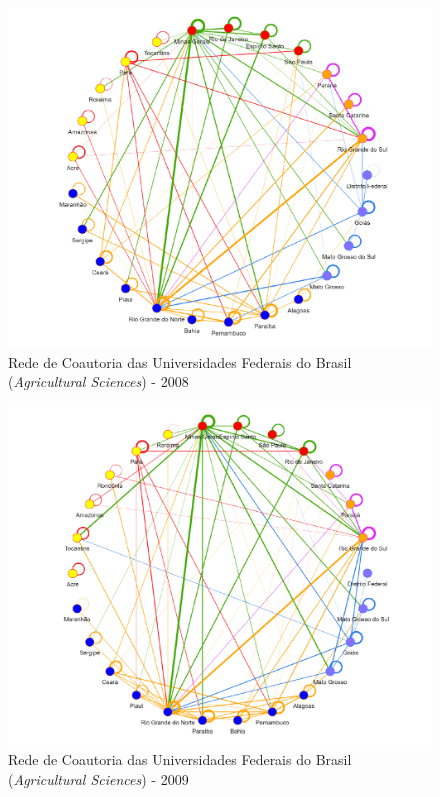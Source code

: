 \begin{figure}[H]
	\centering
	\includegraphics[scale=0.6]{Imagens/rede-agr-br-2008.pdf}
	\caption{Rede de Coautoria das Universidades Federais do Brasil (\textit{Agricultural Sciences}) - 2008}
	\label{Rede de Coautoria - UF AGRI BR 2008}
\end{figure}

\begin{figure}[H]
	\centering
	\includegraphics[scale=0.6]{Imagens/rede-agr-br-2009.pdf}
	\caption{Rede de Coautoria das Universidades Federais do Brasil (\textit{Agricultural Sciences}) - 2009}
	\label{Rede de Coautoria - UF AGRI BR 2009}
\end{figure}

